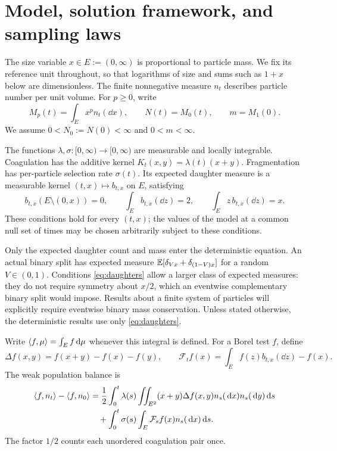 \section{Model, solution framework, and sampling laws}
\label{sec:model}

The size variable $x\in E:=(0,\infty)$ is proportional to particle mass.
We fix its reference unit throughout, so that logarithms of size and sums such
as $1+x$ below are dimensionless. The finite nonnegative measure $n_t$ describes
particle number per unit volume. For $p\geq0$, write
\begin{equation}
 M_p(t)=\int_E x^p n_t(\dd x),\qquad N(t)=M_0(t),\qquad m=M_1(0).
 \label{eq:moments}
\end{equation}
We assume $0<N_0:=N(0)<\infty$ and $0<m<\infty$.

\begin{assumption}\label{ass:rates}
The functions $\lambda,\sigma:[0,\infty)\to[0,\infty)$ are measurable and
locally integrable. Coagulation has the additive kernel
$K_t(x,y)=\lambda(t)(x+y)$. Fragmentation has per-particle selection rate
$\sigma(t)$. Its expected daughter measure is a measurable kernel
$(t,x)\mapsto b_{t,x}$ on $E$, satisfying
\begin{equation}
 b_{t,x}(E\setminus(0,x))=0,\qquad
 \int_E b_{t,x}(\dd z)=2,\qquad
 \int_E z\,b_{t,x}(\dd z)=x.
 \label{eq:daughters}
\end{equation}
These conditions hold for every $(t,x)$; the values of the model at a common
null set of times may be chosen arbitrarily subject to these conditions.
\end{assumption}

Only the expected daughter count and mass enter the deterministic equation.
An actual binary split has expected measure
$\mathbb E[\delta_{Vx}+\delta_{(1-V)x}]$ for a random $V\in(0,1)$.
Conditions \eqref{eq:daughters} allow a larger class of expected measures:
they do not require symmetry about $x/2$, which an eventwise complementary
binary split would impose. Results about a finite system of particles will
explicitly require eventwise binary mass conservation. Unless stated otherwise,
the deterministic results use only \eqref{eq:daughters}.

Write $\langle f,\mu\rangle=\int_E f\,\mathrm d\mu$ whenever this integral is defined.
For a Borel test $f$, define
\begin{equation}
 \Delta f(x,y)=f(x+y)-f(x)-f(y),\qquad
 \mathcal F_t f(x)=\int_E f(z)b_{t,x}(\dd z)-f(x).
 \label{eq:increments}
\end{equation}
The weak population balance is
\begin{align}
 \langle f,n_t\rangle-\langle f,n_0\rangle
 &=\frac12\int_0^t\lambda(s)\iint_{E^2}(x+y)\Delta f(x,y)
                  n_s(\,\mathrm d x)n_s(\,\mathrm d y)\,\mathrm d s\notag\\
 &\quad+\int_0^t\sigma(s)\int_E\mathcal F_s f(x)n_s(\,\mathrm d x)\,\mathrm d s.
 \label{eq:weak}
\end{align}
The factor $1/2$ counts each unordered coagulation pair once.

